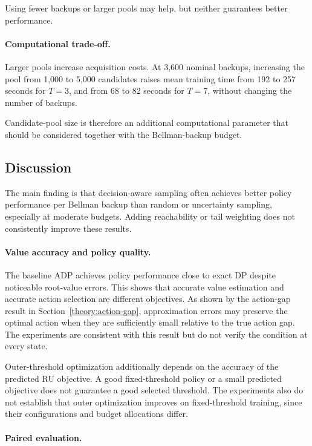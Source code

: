 Using fewer backups or larger pools may help, but neither guarantees better performance.

\paragraph{Computational trade-off.}

Larger pools increase acquisition costs. At 3,600 nominal backups, increasing the pool from 1,000 to 5,000 candidates raises mean training time from 192 to 257 seconds for $T=3$, and from 68 to 82 seconds for $T=7$, without changing the number of backups.

Candidate-pool size is therefore an additional computational parameter that should be considered together with the Bellman-backup budget.


\subsection{Discussion}
\label{res:discussion}

The main finding is that decision-aware sampling often achieves better policy performance per Bellman backup than random or uncertainty sampling, especially at moderate budgets. Adding reachability or tail weighting does not consistently improve these results.

\paragraph{Value accuracy and policy quality.}

The baseline ADP achieves policy performance close to exact DP despite noticeable root-value errors. This shows that accurate value estimation and accurate action selection are different objectives. As shown by the action-gap result in Section~\ref{theory:action-gap}, approximation errors may preserve the optimal action when they are sufficiently small relative to the true action gap. The experiments are consistent with this result but do not verify the condition at every state.

Outer-threshold optimization additionally depends on the accuracy of the predicted RU objective. A good fixed-threshold policy or a small predicted objective does not guarantee a good selected threshold. The experiments also do not establish that outer optimization improves on fixed-threshold training, since their configurations and budget allocations differ.

\paragraph{Paired evaluation.}

